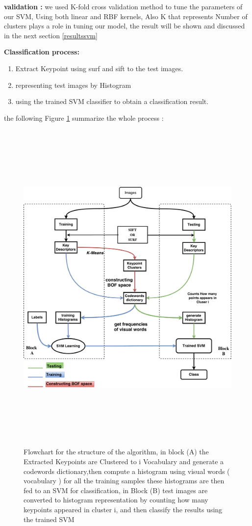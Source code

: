 \textbf{validation :}
we used K-fold cross validation method to tune the parameters of our SVM, Using both linear and RBF kernels, Also K that represents Number of clusters plays a role in tuning our model, the result will be shown and discussed in the next section \ref{resultssvm} 



\textbf{Classification process: }
\begin{enumerate}
    \item Extract Keypoint using surf and sift to the test images.
    \item  representing test images by Histogram
    \item using the trained SVM classifier to obtain a classification result.
    
\end{enumerate}

the following Figure \ref{fig:algo1}  summarize the whole  process :

\begin{figure}[H]
\centering
\includegraphics[width=17cm, height=17cm ]{img/bow/mynewalgo.pdf}
\caption{Flowchart for the structure of the algorithm, in block (A) the Extracted Keypoints  are Clustered to i Vocabulary and generate a codewords dictionary,then compute a histogram using visual words ( vocabulary ) for all the training samples these histograms are then fed to an SVM for classification, in Block (B) test images are converted to histogram representation by counting how many keypoints appeared in cluster i,  and then classify the results using the trained SVM }
\label{fig:algo1}
\end{figure}




